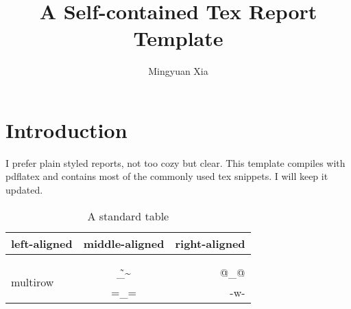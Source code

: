 \documentclass{article}
\title{A Self-contained Tex Report Template}
\author{Mingyuan Xia}
\newcommand{\iwantmyowncontent}[1]{#1}
\begin{document}
\iwantmyowncontent{
\maketitle

\section{Introduction}
I prefer plain styled reports, not too cozy but clear. This template compiles with pdflatex and contains most of the commonly used tex snippets. I will keep it~\cite{echo} updated.
\begin{table}[h]
\centering
\begin{tabular}{|l|c|r|}
\hline
left-aligned & middle-aligned & right-aligned \\
\hline \hline
& \cellcolor[gray]{0.9} & \\
\hline
& & \\
\multirow{2}{*}{multirow}
& \~\_\~ & @\_@ \\
& =\_= & -w- \\
\hline
\end{tabular}
\caption{A standard table}
\label{tab:eample}
\end{table}
{\footnotesize

}

} %
\end{document}
